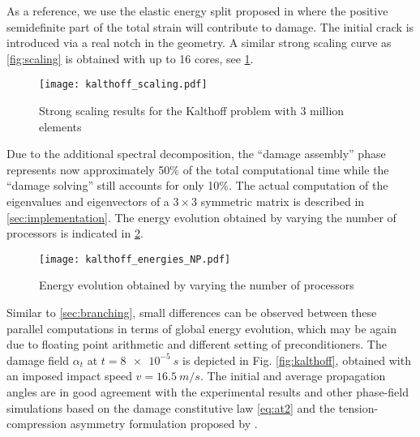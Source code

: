 As a reference, we use the elastic energy split proposed in \cite{FreddiRoyer-Carfagni:2010} where the positive semidefinite part of the total strain will contribute to damage. The initial crack is introduced via a real notch in the geometry. A similar strong scaling curve as \cref{fig:scaling} is obtained with up to 16 cores, see \cref{fig:kalscaling}.
\begin{figure}[htbp]
\centering
\texttt{[image: kalthoff\_scaling.pdf]}
\caption{Strong scaling results for the Kalthoff problem with 3 million elements} \label{fig:kalscaling}
\end{figure}
Due to the additional spectral decomposition, the ``damage assembly'' phase represents now approximately 50\% of the total computational time while the ``damage solving'' still accounts for only 10\%. The actual computation of the eigenvalues and eigenvectors of a $3\times 3$ symmetric matrix is described in \cref{sec:implementation}. The energy evolution obtained by varying the number of processors is indicated in \cref{fig:kalenergy}.
\begin{figure}[htbp]
\centering
\texttt{[image: kalthoff\_energies\_NP.pdf]}
\caption{Energy evolution obtained by varying the number of processors} \label{fig:kalenergy}
\end{figure}
Similar to \cref{sec:branching}, small differences can be observed between these parallel computations in terms of global energy evolution, which may be again due to floating point arithmetic and different setting of preconditioners. The damage field $\alpha_t$ at $t=\SI{8e-5}{s}$ is depicted in Fig. \ref{fig:kalthoff}, obtained with an imposed impact speed $v=\SI{16.5}{m/s}$. The initial and average propagation angles are in good agreement with the experimental results and other phase-field simulations \cite{BordenVerhooselScottHughesLandis:2012,HofackerMiehe:2012} based on the damage constitutive law \eqref{eq:at2} and the tension-compression asymmetry formulation proposed by \cite{MieheHofackerWelschinger:2010}.

